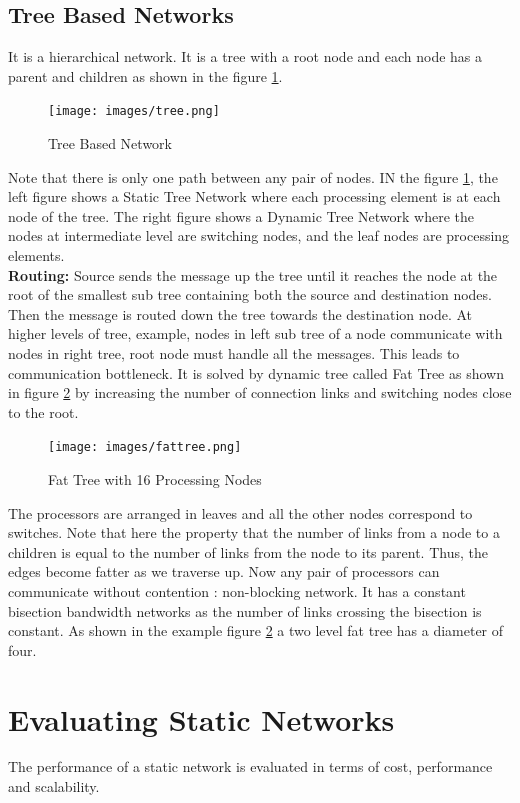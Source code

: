 \documentclass[12pt]{book}
\begin{document}
\subsection{Tree Based Networks}
It is a hierarchical network. It is a tree with a root node and each node has a parent and children
as shown in the figure \ref{fig:tree}.
\begin{figure}[H]
    \centering
    \texttt{[image: images/tree.png]}
    \caption{Tree Based Network}
    \label{fig:tree}
\end{figure}
Note that there is only one path between any pair of nodes.
IN the figure \ref{fig:tree}, the left figure shows a Static Tree Network where each processing element is at 
each node of the tree. The right figure shows a Dynamic Tree Network where the nodes at intermediate level
are switching nodes, and the leaf nodes are processing elements.\\
\textbf{Routing: }Source sends the message up the tree until it reaches the node at the root of the smallest sub tree containing both the 
source and destination nodes. Then the message is routed down the tree towards the destination node.
At higher levels of tree, example, nodes in left sub tree of a node communicate with nodes in right tree, root node must handle all the messages. This leads to
communication bottleneck. It is solved by dynamic tree called Fat Tree as shown in figure \ref{fig:fattree} by increasing the number of connection links and switching nodes close to the root.
\begin{figure}[H]
    \centering
    \texttt{[image: images/fattree.png]}
    \caption{Fat Tree with 16 Processing Nodes}
    \label{fig:fattree}
\end{figure}
The processors are arranged in leaves and all the other nodes correspond to switches. Note that here the property that 
the number of links from a node to a children is equal to the number of links from the node to its parent. Thus, the edges become fatter as we traverse up.
Now any pair of processors can communicate without contention : non-blocking network. It has a constant bisection bandwidth networks as 
the number of links crossing the bisection is constant. As shown in the example figure \ref{fig:fattree} a two level fat tree has a diameter of four.
\section{Evaluating Static Networks}
The performance of a static network is evaluated in terms of cost, performance and scalability.
\end{document}
